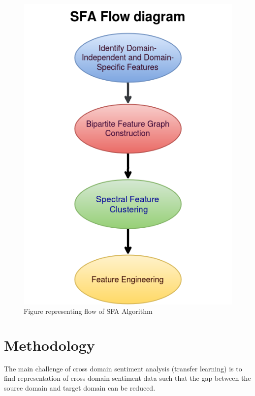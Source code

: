 \documentclass{report}
\begin{document}
\chapter*{}
\begin{figure}[!h]
  \includegraphics[width=0.9\linewidth]{SFA_flow_diagram.png}
  \caption{Figure representing flow of SFA Algorithm}
  \label{Fig:2}
\end{figure}




\chapter{Methodology}

The main challenge of cross domain sentiment analysis (transfer learning) is to find  representation of cross domain sentiment data such that the gap between the source domain and target domain can be reduced.\\
\end{document}
